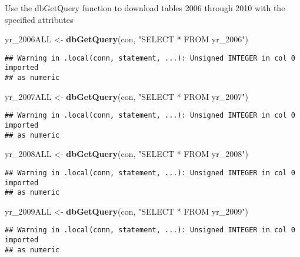 \documentclass[]{article}
\newenvironment{Shaded}{\begin{snugshade}}{\end{snugshade}}
\newcommand{\KeywordTok}[1]{\textcolor[rgb]{0.13,0.29,0.53}{\textbf{#1}}}
\newcommand{\NormalTok}[1]{#1}
\newcommand{\StringTok}[1]{\textcolor[rgb]{0.31,0.60,0.02}{#1}}
\begin{document}
Use the dbGetQuery function to download tables 2006 through 2010 with
the specified attributes

\begin{Shaded}
\begin{Highlighting}[]
\NormalTok{yr_2006ALL <-}\StringTok{ }\KeywordTok{dbGetQuery}\NormalTok{(con, }\StringTok{"SELECT * FROM yr_2006"}\NormalTok{)}
\end{Highlighting}
\end{Shaded}

\begin{verbatim}
## Warning in .local(conn, statement, ...): Unsigned INTEGER in col 0 imported
## as numeric
\end{verbatim}

\begin{Shaded}
\begin{Highlighting}[]
\NormalTok{yr_2007ALL <-}\StringTok{ }\KeywordTok{dbGetQuery}\NormalTok{(con, }\StringTok{"SELECT * FROM yr_2007"}\NormalTok{)}
\end{Highlighting}
\end{Shaded}

\begin{verbatim}
## Warning in .local(conn, statement, ...): Unsigned INTEGER in col 0 imported
## as numeric
\end{verbatim}

\begin{Shaded}
\begin{Highlighting}[]
\NormalTok{yr_2008ALL <-}\StringTok{ }\KeywordTok{dbGetQuery}\NormalTok{(con, }\StringTok{"SELECT * FROM yr_2008"}\NormalTok{)}
\end{Highlighting}
\end{Shaded}

\begin{verbatim}
## Warning in .local(conn, statement, ...): Unsigned INTEGER in col 0 imported
## as numeric
\end{verbatim}

\begin{Shaded}
\begin{Highlighting}[]
\NormalTok{yr_2009ALL <-}\StringTok{ }\KeywordTok{dbGetQuery}\NormalTok{(con, }\StringTok{"SELECT * FROM yr_2009"}\NormalTok{)}
\end{Highlighting}
\end{Shaded}

\begin{verbatim}
## Warning in .local(conn, statement, ...): Unsigned INTEGER in col 0 imported
## as numeric
\end{verbatim}
\end{document}
